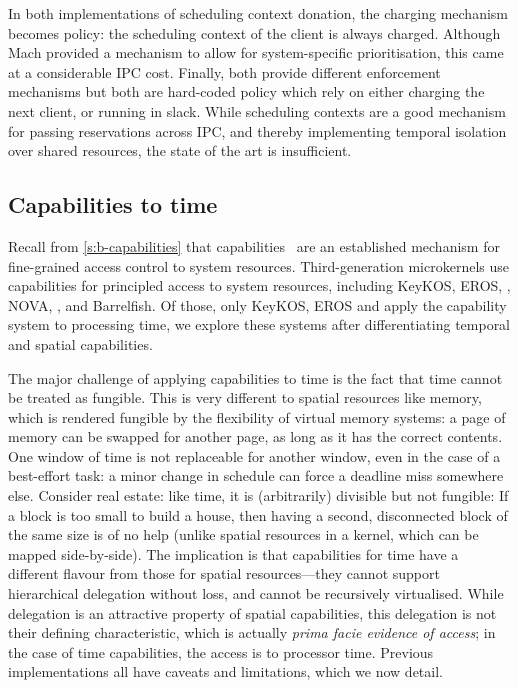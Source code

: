 In both implementations of scheduling context donation, the charging mechanism becomes policy: the
scheduling context of the client is always charged. Although Mach provided a mechanism to allow for
system-specific prioritisation, this came at a considerable IPC cost. Finally, both provide
different enforcement mechanisms but both are hard-coded policy which rely on either charging the
next client, or running in slack. While scheduling contexts are a good mechanism for
passing reservations across \gls{IPC}, and thereby implementing temporal isolation over shared
resources, the state of the art is insufficient.


\subsection{Capabilities to time}
\label{s:os-capabilities}

Recall from \cref{s:b-capabilities} that capabilities~\citep{Dennis_VanHorn_66} are an established mechanism for
fine-grained access control to system resources.
Third-generation microkernels use capabilities for principled access to system resources, including 
KeyKOS, EROS, \fiascooc, NOVA, \selfour, \composite and Barrelfish. Of those, only KeyKOS, EROS and
\composite apply the capability system to processing time, we explore these systems after
differentiating temporal and spatial capabilities. 

The major challenge of applying capabilities to time is the fact that time cannot be treated
as fungible. This is very different to spatial resources like memory, which is rendered fungible by the
flexibility of virtual memory systems: a page of memory can be swapped for another page,
as long as it has the correct contents. One window of time is not replaceable for another window, even in the case of a
best-effort task: a minor change in schedule can force a deadline miss somewhere else.
Consider real estate: like time, it is (arbitrarily) divisible but not fungible: If
a block is too small to build a house, then having a second,
disconnected block of the same size is of no help (unlike spatial resources in a kernel, which can
be mapped side-by-side). The implication is
that capabilities for time have a different flavour from those for
spatial resources---they cannot support hierarchical delegation
without loss, and cannot be recursively virtualised. While delegation is an
attractive property of spatial capabilities,
this delegation is not their defining characteristic, which is actually
\emph{prima facie evidence of access}; in the case of time
capabilities, the access is to processor time.
Previous implementations all have caveats and limitations, which we now detail.

